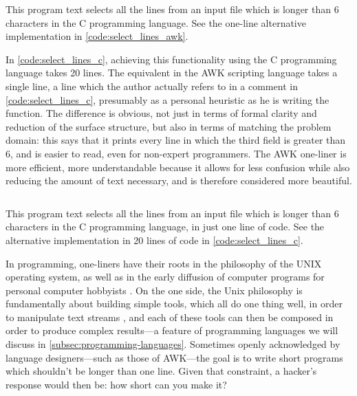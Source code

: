 \begin{listing}
  \inputminted{cpp}{./corpus/select_lines.c}
  \caption{This program text selects all the lines from an input file which is longer than 6 characters in the C programming language. See the one-line alternative implementation in \ref{code:select_lines_awk}.}
  \label{code:select_lines_c}
\end{listing}

In \ref{code:select_lines_c}, achieving this functionality  using the C programming language takes 20 lines. The equivalent in the AWK scripting language takes a single line, a line which the author actually refers to in a comment in \ref{code:select_lines_c}, presumably as a personal heuristic as he is writing the function. The difference is obvious, not just in terms of formal clarity and reduction of the surface structure, but also in terms of matching the problem domain: this says that it prints every line in which the third field is greater than 6, and is easier to read, even for non-expert programmers. The AWK one-liner is more efficient, more understandable because it allows for less confusion while also reducing the amount of text necessary, and is therefore considered more beautiful.

\begin{listing}
  \inputminted{bash}{./corpus/select_lines.sh}
  \caption{This program text selects all the lines from an input file which is longer than 6 characters in the C programming language, in just one line of code. See the alternative implementation in 20 lines of code in \ref{code:select_lines_c}.}
  \label{code:select_lines_awk}
\end{listing}

In programming, one-liners have their roots in the philosophy of the UNIX operating system, as well as in the early diffusion of computer programs for personal computer hobbyists \citep{montfort_10_2014}. On the one side, the Unix philosophy is fundamentally about building simple tools, which all do one thing well, in order to manipulate text streams \citep{raymond_art_2003}, and each of these tools can then be composed in order to produce complex results—a feature of programming languages we will discuss in \ref{subsec:programming-languages}. Sometimes openly acknowledged by language designers—such as those of AWK—the goal is to write short programs which shouldn't be longer than one line. Given that constraint, a hacker's response would then be: how short can you make it?

